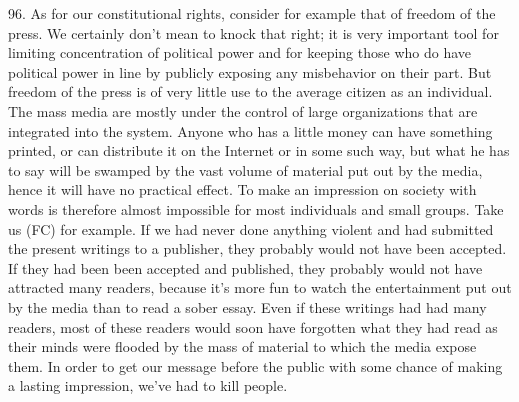 \documentclass{article}
\begin{document}
96. As for our constitutional rights, consider for example that of freedom of the press. We 
certainly don’t mean to knock that right; it is very important tool for limiting concentration of 
political power and for keeping those who do have political power in line by publicly exposing 
any misbehavior on their part. But freedom of the press is of very little use to the average citizen 
as an individual. The mass media are mostly under the control of large organizations that are 
integrated into the system. Anyone who has a little money can have something printed, or can 
distribute it on the Internet or in some such way, but what he has to say will be swamped by the 
vast volume of material put out by the media, hence it will have no practical effect. To make an 
impression on society with words is therefore almost impossible for most individuals and small 
groups. Take us (FC) for example. If we had never done anything violent and had submitted the 
present writings to a publisher, they probably would not have been accepted. If they had been 
been accepted and published, they probably would not have attracted many readers, because it’s 
more fun to watch the entertainment put out by the media than to read a sober essay. Even if these 
writings had had many readers, most of these readers would soon have forgotten what they had 
read as their minds were flooded by the mass of material to which the media expose them. In order 
to get our message before the public with some chance of making a lasting impression, we’ve had 
to kill people. \vspace{\baselineskip}
\end{document}
